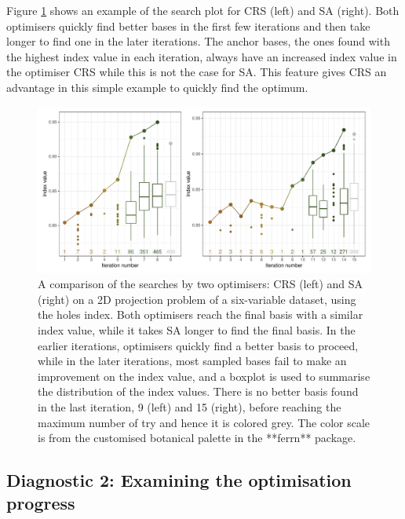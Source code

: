 Figure \ref{fig:toy-search} shows an example of the search plot for CRS
(left) and SA (right). Both optimisers quickly find better bases in the
first few iterations and then take longer to find one in the later
iterations. The anchor bases, the ones found with the highest index
value in each iteration, always have an increased index value in the
optimiser CRS while this is not the case for SA. This feature gives CRS
an advantage in this simple example to quickly find the optimum.

\begin{Schunk}
\begin{figure}

{\centering \includegraphics[width=1\linewidth]{figs/toy-search} 

}

\caption[A comparison of the searches by two optimisers]{A comparison of the searches by two optimisers: CRS (left) and SA (right) on a 2D projection problem of a six-variable dataset,  using the holes index. Both optimisers reach the final basis with a similar index value, while it takes SA longer to find the final basis. In the earlier iterations, optimisers quickly find a better basis to proceed, while in the later iterations, most sampled bases fail to make an improvement on the index value, and a boxplot is used to summarise the distribution of the index values. There is no better basis found in the last iteration, 9 (left) and 15 (right), before reaching the maximum number of try and hence it is colored grey. The color scale is from the customised botanical palette in the **ferrn** package.}\label{fig:toy-search}
\end{figure}
\end{Schunk}

\hypertarget{toy-interp}{%
\subsection{Diagnostic 2: Examining the optimisation
progress}\label{toy-interp}}

